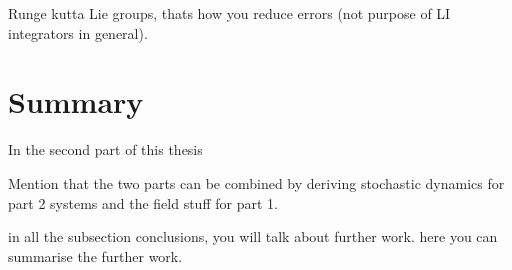  
 Runge kutta Lie groups, thats how you reduce errors (not purpose of LI integrators in general).

\chapter*{Summary}
 
 In the second part of this thesis
 
 Mention that the two parts can be combined by deriving stochastic dynamics for part 2 systems and the field stuff for part 1.




in all the subsection conclusions, you will talk about further work. here you can summarise the further work.
